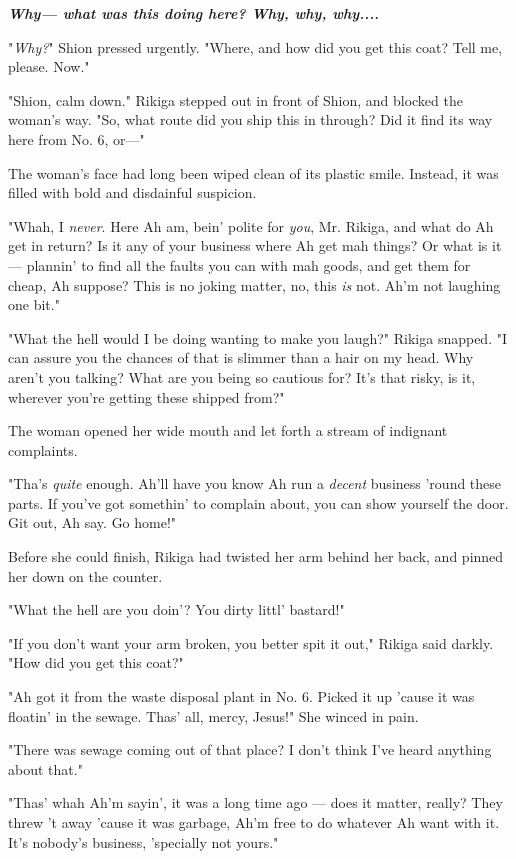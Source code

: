 \textbf{\emph{Why--- what was this doing here? Why, why, why....}}

"\emph{Why?}" Shion pressed urgently. "Where, and how did you get this coat?
Tell me, please. Now."

"Shion, calm down." Rikiga stepped out in front of Shion, and blocked
the woman's way. "So, what route did you ship this in through? Did it
find its way here from No. 6, or---"

The woman's face had long been wiped clean of its plastic smile.
Instead, it was filled with bold and disdainful suspicion.

"Whah, I \emph{never}. Here Ah am, bein' polite for \emph{you}, Mr. Rikiga, and what
do Ah get in return? Is it any of your business where Ah get mah things?
Or what is it--- plannin' to find all the faults you can with mah goods,
and get them for cheap, Ah suppose? This is no joking matter, no, this
\emph{is} not. Ah'm not laughing one bit."

"What the hell would I be doing wanting to make you laugh?" Rikiga
snapped. "I can assure you the chances of that is slimmer than a hair on
my head. Why aren't you talking? What are you being so cautious for?
It's that risky, is it, wherever you're getting these shipped from?"

The woman opened her wide mouth and let forth a stream of indignant
complaints.~

"Tha's \emph{quite} enough. Ah'll have you know Ah run a \emph{decent} business 'round
these parts. If you've got somethin' to complain about, you can show
yourself the door. Git out, Ah say. Go home!"

Before she could finish, Rikiga had twisted her arm behind her back, and
pinned her down on the counter.

"What the hell are you doin'? You dirty littl' bastard!"

"If you don't want your arm broken, you better spit it out," Rikiga said
darkly. "How did you get this coat?"

"Ah got it from the waste disposal plant in No. 6. Picked it up 'cause
it was floatin' in the sewage. Thas' all, mercy, Jesus!" She winced in
pain.

"There was sewage coming out of that place? I don't think I've heard
anything about that."

"Thas' whah Ah'm sayin', it was a long time ago --- does it matter,
really? They threw 't away 'cause it was garbage, Ah'm free to do
whatever Ah want with it. It's nobody's business, 'specially not yours."

